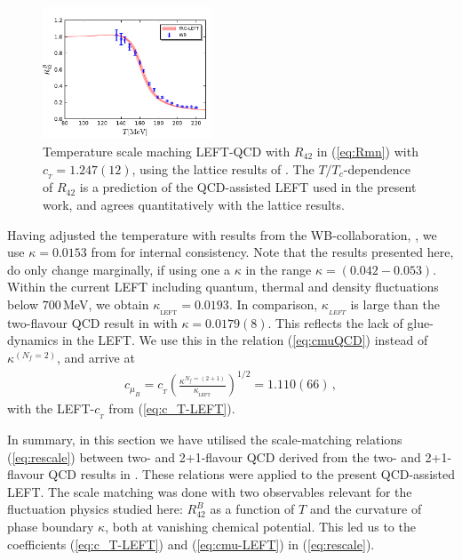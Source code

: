 \documentclass[%
reprint,
superscriptaddress,
showpacs,preprintnumbers,
amsmath,amssymb,
aps,
prd,
]{revtex4-1}
\def\eq#1{(\ref{#1})}
\begin{document}
	\begin{figure}[t]
		\includegraphics[width=0.45\textwidth]{T-adjust}
		\caption{Temperature scale maching LEFT-QCD with $R_{42}$ in \eq{eq:Rmn} with $c_{_{T}}=1.247(12)$, using the lattice results of \cite{Borsanyi:2018grb}. The $T/T_c$-dependence of $R_{42}$ is a prediction of the QCD-assisted LEFT used in the present work, and agrees quantitatively with the lattice results.}\label{fig:T-adjust}
	\end{figure}
	Having adjusted the temperature with results from the WB-collaboration, \cite{Bellwied:2015rza}, we use $\kappa=0.0153$ from \cite{Borsanyi:2020fev} for internal consistency. Note that the results presented here, do only change marginally, if using one a $\kappa$ in the range $\kappa=(0.042 - 0.053)$. Within the current LEFT including quantum, thermal and density fluctuations below $700$\,MeV, we obtain $\kappa_{_\textrm{LEFT}}=0.0193$. In comparison, $\kappa_{_{LEFT}}$ is large than the two-flavour QCD result in \cite{Fu:2019hdw} with $\kappa=0.0179(8)$. This reflects the lack of glue-dynamics in the LEFT. We 
	use this in the relation \eq{eq:cmuQCD} instead of $\kappa^{(N_f=2)}$, and arrive at  
	\begin{align}
		c_{\mu_B}=c_{_{T}}\left(\frac{\kappa^{N_f=(2+1)}}{\kappa_{_{\textrm{LEFT}}}}\right)^{1/2}=1.110(66)\,, \label{eq:cmu-LEFT}
	\end{align}
	with the LEFT-$c_{_T}$ from \eq{eq:c_T-LEFT}. 
	
	In summary, in this section we have utilised the scale-matching relations \eq{eq:rescale} between two- and 2+1-flavour QCD derived from the two- and 2+1-flavour QCD results in \cite{Fu:2019hdw}. These relations were applied to the present QCD-assisted LEFT. The scale matching was done with two observables relevant for the fluctuation physics studied here: $R^{B}_{42}$ as a function of $T$ and the curvature of phase boundary $\kappa$, both at vanishing chemical potential. This led us to the coefficients \eq{eq:c_T-LEFT} and \eq{eq:cmu-LEFT} 
	in \eq{eq:rescale}.
	
\end{document}
